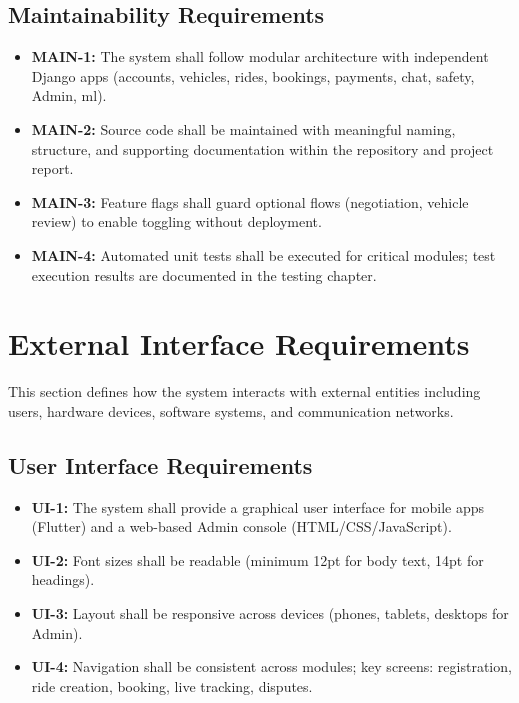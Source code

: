 \subsection{Maintainability Requirements}
\begin{itemize}
\item \textbf{MAIN-1:} The system shall follow modular architecture with independent Django apps (accounts, vehicles, rides, bookings, payments, chat, safety, Admin, ml).
\item \textbf{MAIN-2:} Source code shall be maintained with meaningful naming, structure, and supporting documentation within the repository and project report.
\item \textbf{MAIN-3:} Feature flags shall guard optional flows (negotiation, vehicle review) to enable toggling without deployment.
\item \textbf{MAIN-4:} Automated unit tests shall be executed for critical modules; test execution results are documented in the testing chapter.
\end{itemize}

\section{External Interface Requirements}

This section defines how the system interacts with external entities including users, hardware devices, software systems, and communication networks.

\subsection{User Interface Requirements}
\begin{itemize}
\item \textbf{UI-1:} The system shall provide a graphical user interface for mobile apps (Flutter) and a web-based Admin console (HTML/CSS/JavaScript).
\item \textbf{UI-2:} Font sizes shall be readable (minimum 12pt for body text, 14pt for headings).
\item \textbf{UI-3:} Layout shall be responsive across devices (phones, tablets, desktops for Admin).
\item \textbf{UI-4:} Navigation shall be consistent across modules; key screens: registration, ride creation, booking, live tracking, disputes.
\end{itemize}


